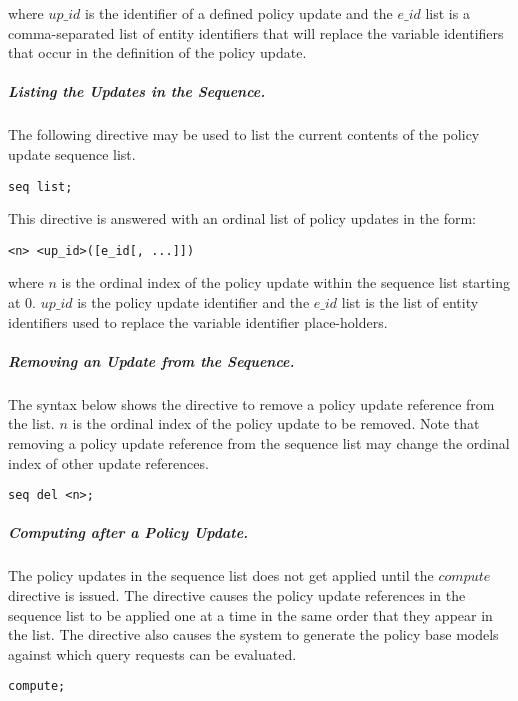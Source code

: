 \documentclass[10pt, twocolumn]{article}
\begin{document}
          \noindent where $up\_id$ is the identifier of a defined policy
          update and the $e\_id$ list is a comma-separated list of entity
          identifiers that will replace the variable identifiers that occur in
          the definition of the policy update. 

        \subparagraph{Listing the Updates in the Sequence.}
          The following directive may be used to list the current contents of
          the policy update sequence list.

          \begin{verbatim}seq list;\end{verbatim}

          This directive is answered with an ordinal list of policy updates in
          the form:

          \begin{verbatim}<n> <up_id>([e_id[, ...]])\end{verbatim}

          \noindent where $n$ is the ordinal index of the policy update within
          the sequence list starting at 0. $up\_id$ is the policy update
          identifier and the $e\_id$ list is the list of entity identifiers
          used to replace the variable identifier place-holders.

        \subparagraph{Removing an Update from the Sequence.}
          The syntax below shows the directive to remove a policy update
          reference from the list. $n$ is the ordinal index of the policy
          update to be removed. Note that removing a policy update reference
          from the sequence list may change the ordinal index of other update
          references.

          \begin{verbatim}seq del <n>;\end{verbatim}

        \subparagraph{Computing after a Policy Update.}

          The policy updates in the sequence list does not get applied until
          the $compute$ directive is issued. The directive causes the policy
          update references in the sequence list to be applied one at a time in
          the same order that they appear in the list. The directive also
          causes the system to generate the policy base models against which
          query requests can be evaluated.

          \begin{verbatim}compute;\end{verbatim}
\end{document}
